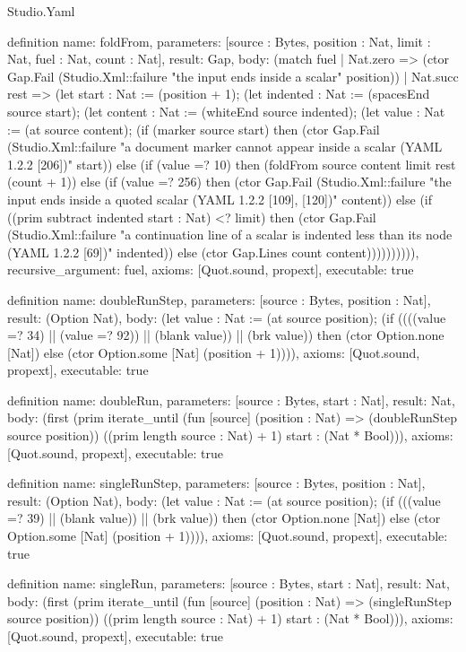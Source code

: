 \begin{lexlean}{Studio.Yaml}
\begin{semanticmodule}
definition{
  name: foldFrom,
  parameters: [source : Bytes, position : Nat, limit : Nat, fuel : Nat, count : Nat],
  result: Gap,
  body: (match fuel
    | Nat.zero => (ctor Gap.Fail (Studio.Xml::failure "the input ends inside a scalar" position))
    | Nat.succ rest => (let start : Nat := (position + 1); (let indented : Nat := (spacesEnd source start); (let content : Nat := (whiteEnd source indented); (let value : Nat := (at source content); (if (marker source start) then (ctor Gap.Fail (Studio.Xml::failure "a document marker cannot appear inside a scalar (YAML 1.2.2 [206])" start)) else (if (value =? 10) then (foldFrom source content limit rest (count + 1)) else (if (value =? 256) then (ctor Gap.Fail (Studio.Xml::failure "the input ends inside a quoted scalar (YAML 1.2.2 [109], [120])" content)) else (if ((prim subtract indented start : Nat) <? limit) then (ctor Gap.Fail (Studio.Xml::failure "a continuation line of a scalar is indented less than its node (YAML 1.2.2 [69])" indented)) else (ctor Gap.Lines count content)))))))))),
  recursive_argument: fuel,
  axioms: [Quot.sound, propext],
  executable: true
}

definition{
  name: doubleRunStep,
  parameters: [source : Bytes, position : Nat],
  result: (Option Nat),
  body: (let value : Nat := (at source position); (if ((((value =? 34) || (value =? 92)) || (blank value)) || (brk value)) then (ctor Option.none [Nat]) else (ctor Option.some [Nat] (position + 1)))),
  axioms: [Quot.sound, propext],
  executable: true
}

definition{
  name: doubleRun,
  parameters: [source : Bytes, start : Nat],
  result: Nat,
  body: (first (prim iterate_until (fun [source] (position : Nat) => (doubleRunStep source position)) ((prim length source : Nat) + 1) start : (Nat * Bool))),
  axioms: [Quot.sound, propext],
  executable: true
}

definition{
  name: singleRunStep,
  parameters: [source : Bytes, position : Nat],
  result: (Option Nat),
  body: (let value : Nat := (at source position); (if (((value =? 39) || (blank value)) || (brk value)) then (ctor Option.none [Nat]) else (ctor Option.some [Nat] (position + 1)))),
  axioms: [Quot.sound, propext],
  executable: true
}

definition{
  name: singleRun,
  parameters: [source : Bytes, start : Nat],
  result: Nat,
  body: (first (prim iterate_until (fun [source] (position : Nat) => (singleRunStep source position)) ((prim length source : Nat) + 1) start : (Nat * Bool))),
  axioms: [Quot.sound, propext],
  executable: true
}


\end{semanticmodule}
\end{lexlean}
